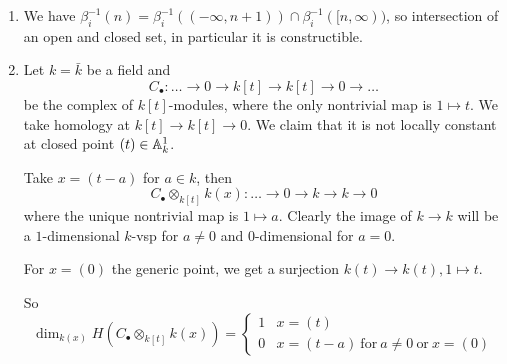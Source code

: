 \begin{exercise}{2}
\begin{enumerate}[label=(\roman*)]
        \item{
                We have $\beta^{-1}_i(n) = \beta^{-1}_i((-\infty, n + 1)) \cap
                \beta^{-1}_i([n, \infty))$, so intersection of an open and
                closed set, in particular it is constructible.
            }
        \item{
                Let $k = \bar{k}$ be a field and
                \begin{equation*}
                    C_\bullet \colon \dots \to 0 \to k[t] \to k[t] \to 0 \to \dots
                \end{equation*}
                be the complex of $k[t]$-modules, where the only nontrivial map
                is $1 \mapsto t$.
                We take homology at $k[t] \to k[t] \to 0$.
                We claim that it is not locally constant at closed point $(t) \in
                \mathbb{A}^1_k$.

                Take $x = (t - a)$ for $a \in k$, then
                \begin{equation*}
                    C_\bullet \otimes_{k[t]} k(x) \colon \dots \to 0 \to k \to k
                    \to 0
                \end{equation*}
                where the unique nontrivial map is $1 \mapsto a$.
                Clearly the image of $k \to k$ will be a $1$-dimensional $k$-vsp
                for $a \not= 0$ and $0$-dimensional for $a = 0$.

                For $x = (0)$ the generic point, we get a surjection $k(t) \to k(t), 1
                \mapsto t$.

                So
                \begin{equation*}
                    \dim_{k(x)} H(C_\bullet \otimes_{k[t]} k(x)) =
                    \begin{cases}
                        1 & x = (t) \\
                        0 & x = (t-a)\ \text{for}\ a \not= 0\ \text{or}\ x = (0)
                    \end{cases}
                \end{equation*}
            }
    \end{enumerate}
\end{exercise}

